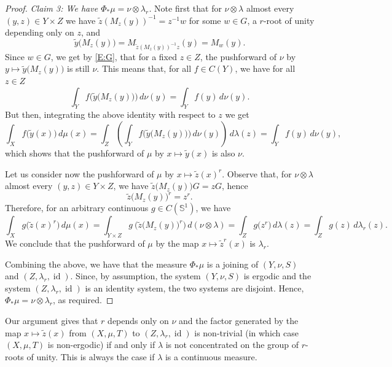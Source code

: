 \documentclass[11pt]{amsart}
\theoremstyle{definition}
\renewcommand{\S}{\mathbb{S}}
\DeclareMathOperator{\id}{id}
\begin{document}
\begin{proof}
	{\em Claim 3: We have $\Phi_*\mu=\nu\otimes \lambda_r$.}
	Note first that  for $\nu\otimes\lambda$ almost every $(y,z)\in Y\times Z$ we have $\tilde z\left( M_z(y) \right)^{-1}=z^{-1}w$ for  some  $w\in G$, a  $r$-root of unity depending only on $z$, and
	$$
	\tilde y\bigl( M_z(y) \bigr) = M_{\tilde z\left( M_z(y) \right)^{-1}z} (y) = M_w(y).
	$$
	Since $w\in G$, we get by \eqref{E:G},  that for a fixed $z\in Z$, the pushforward of $\nu$ by $y\mapsto\tilde y\bigl( M_z(y) \bigr)$ is still $\nu$.
	This means that, for all  $f\in C(Y)$, we have for all $z\in Z$
	$$ \int_Y f\bigl(\tilde y\bigl(M_z(y)\bigr)\bigr)\, d\nu(y) = \int_Y f(y)\,d\nu(y).
	$$
	But then, integrating the above identity with respect to $z$ we get
	$$
	\int_X f\bigl(\tilde y(x)\bigl)\,d\mu(x)
	= \int_Z \left( \int_Y f\bigl(\tilde y\bigl(M_z(y)\bigr)\bigr)\, d\nu(y) \right)\,d\lambda(z) = \int_Y f(y)\,d\nu(y),
	$$
	which shows that the pushforward of $\mu$ by $x\mapsto \tilde y(x)$ is also $\nu$.
	
	Let us consider now the pushforward of $\mu$ by $x\mapsto \tilde{z}(x)^r$.
	Observe that, for $\nu\otimes\lambda$ almost every $(y,z)\in Y\times Z$, we have $\tilde z\bigl(M_z(y)\bigr)G=zG$, hence
	$$ \tilde z\bigl(M_z(y)\bigr)^r = z^r. $$
	Therefore, for an arbitrary continuous  $g\in C(\S^1)$, we have
	$$
	\int_X g\big(\tilde z(x)^r\big)\, d\mu(x) = \int_{Y\times Z} g\
	\bigl(\tilde z\bigl(M_z(y)\bigr)^r\bigr)\,d(\nu\otimes\lambda) =  \int_Z g\bigl( z^r\bigr)\, d\lambda(z) = \int_{Z} g(z)\, d\lambda_r(z).
	$$
	We conclude that the pushforward of $\mu$ by the map  $x\mapsto \tilde{z}^r(x)$ is $\lambda_r$.
	
	
	
	Combining the above, we have  that 	
	the measure $\Phi_*\mu$  is a joining of $(Y,\nu,S)$ and $(Z,\lambda_r,\id)$.
	Since, by assumption,  the system $(Y,\nu,S)$ is ergodic and the system $(Z,\lambda_r,\id)$ is an identity system, the two systems are disjoint. Hence,
	$\Phi_*\mu=\nu\otimes \lambda_r$, as required.
\end{proof}
Our argument gives that  $r$ depends only on $\nu$
and the factor generated by the map $x\mapsto \tilde z(x)$ from $(X,\mu,T)$ to $(Z,\lambda_r, \id)$ is non-trivial (in which case $(X,\mu,T)$ is non-ergodic)
if and only if $\lambda$ is not concentrated on the group of $r$-roots of unity. This is always  the case if $\lambda$ is a continuous measure.
\end{document}
